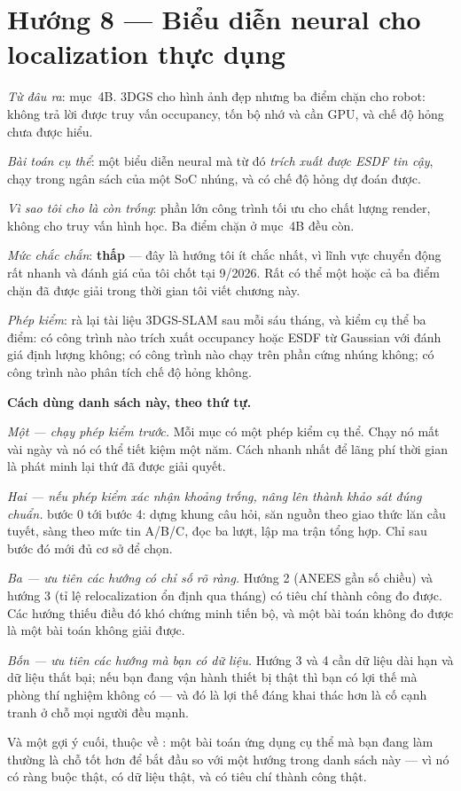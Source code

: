 \documentclass[../../vslam.tex]{subfiles}
\begin{document}
\section{Hướng 8 --- Biểu diễn neural cho localization thực dụng}

\emph{Từ đâu ra}:  mục~4B. 3DGS cho hình ảnh đẹp nhưng ba điểm chặn cho robot: không trả lời được truy vấn occupancy, tốn bộ nhớ và cần GPU, và chế độ hỏng chưa được hiểu.

\emph{Bài toán cụ thể}: một biểu diễn neural mà từ đó \emph{trích xuất được ESDF tin cậy}, chạy trong ngân sách của một SoC nhúng, và có chế độ hỏng dự đoán được.

\emph{Vì sao tôi cho là còn trống}: phần lớn công trình tối ưu cho chất lượng render, không cho truy vấn hình học. Ba điểm chặn ở  mục~4B đều còn.

\emph{Mức chắc chắn}: \textbf{thấp} --- đây là hướng tôi ít chắc nhất, vì lĩnh vực chuyển động rất nhanh và đánh giá của tôi chốt tại 9/2026. Rất có thể một hoặc cả ba điểm chặn đã được giải trong thời gian tôi viết chương này.

\emph{Phép kiểm}: rà lại tài liệu 3DGS-SLAM sau mỗi sáu tháng, và kiểm cụ thể ba điểm: có công trình nào trích xuất occupancy hoặc ESDF từ Gaussian với đánh giá định lượng không; có công trình nào chạy trên phần cứng nhúng không; có công trình nào phân tích chế độ hỏng không.

\begin{cannho}
\textbf{Cách dùng danh sách này, theo thứ tự.}

\emph{Một --- chạy phép kiểm trước.} Mỗi mục có một phép kiểm cụ thể. Chạy nó mất vài ngày và nó có thể tiết kiệm một năm. Cách nhanh nhất để lãng phí thời gian là phát minh lại thứ đã được giải quyết.

\emph{Hai --- nếu phép kiểm xác nhận khoảng trống, nâng lên thành khảo sát đúng chuẩn.}  bước 0 tới bước 4: dựng khung câu hỏi, săn nguồn theo giao thức lăn cầu tuyết, sàng theo mức tin A/B/C, đọc ba lượt, lập ma trận tổng hợp. Chỉ sau bước đó mới đủ cơ sở để chọn.

\emph{Ba --- ưu tiên các hướng có chỉ số rõ ràng.} Hướng 2 (ANEES gần số chiều) và hướng 3 (tỉ lệ relocalization ổn định qua tháng) có tiêu chí thành công đo được. Các hướng thiếu điều đó khó chứng minh tiến bộ, và một bài toán không đo được là một bài toán không giải được.

\emph{Bốn --- ưu tiên các hướng mà bạn có dữ liệu.} Hướng 3 và 4 cần dữ liệu dài hạn và dữ liệu thất bại; nếu bạn đang vận hành thiết bị thật thì bạn có lợi thế mà phòng thí nghiệm không có --- và đó là lợi thế đáng khai thác hơn là cố cạnh tranh ở chỗ mọi người đều mạnh.

Và một gợi ý cuối, thuộc về : một bài toán ứng dụng cụ thể mà bạn đang làm thường là chỗ tốt hơn để bắt đầu so với một hướng trong danh sách này --- vì nó có ràng buộc thật, có dữ liệu thật, và có tiêu chí thành công thật.
\end{cannho}
\end{document}

